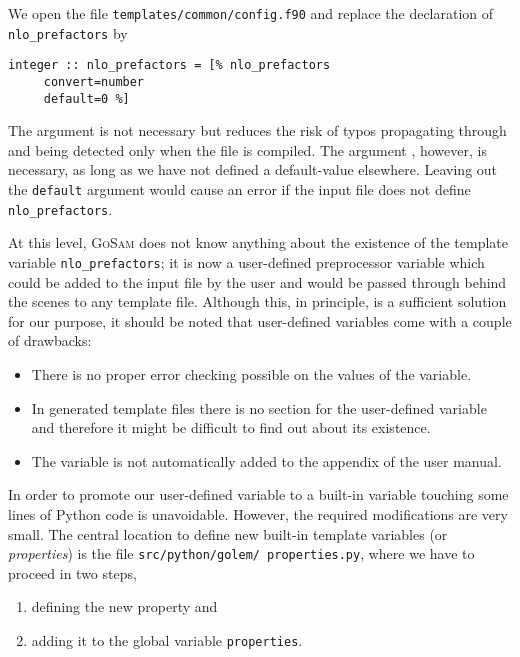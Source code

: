 \documentclass[11pt,a4paper]{refrep}
\newcommand{\golem}{\textsc{GoSam}\xspace}
\newcommand{\python}{Python\xspace}
\begin{document}
We open the file \texttt{templates/\hspace{0pt}common\hspace{0pt}/config.f90}
and replace the declaration of \texttt{nlo\_prefactors} by
\begin{lstlisting}
integer :: nlo_prefactors = [% nlo_prefactors
     convert=number
     default=0 %]
\end{lstlisting}
The argument  is not necessary but reduces the risk
of typos propagating through and being detected only when the file is
compiled. The argument , however, is necessary, as long
as we have not defined a default-value elsewhere. Leaving out the
\texttt{default} argument would cause an error if the input file does
not define \texttt{nlo\_prefactors}.

At this level, \golem{} does not know anything about the existence of
the template variable \texttt{nlo\_prefactors}; it is now a
user-defined preprocessor variable which could be added to the input
file by the user and would be passed through behind the scenes to any
template file.
Although this, in principle, is a sufficient solution for our purpose,
it should be noted that user-defined variables come with a couple of
drawbacks:
\begin{itemize}
\item There is no proper error checking possible on the values of
      the variable.
\item In generated template files there is no section for the
      user-defined variable and therefore it might be difficult
      to find out about its existence.
\item The variable is not automatically added to the appendix of
      the user manual.
\end{itemize}

In order to promote our user-defined variable to a built-in variable
touching some lines of \python{} code is unavoidable. However, the
required modifications are very small. The central location to define
new built-in template variables (or \emph{properties}) is the file
\texttt{src/\hspace{0pt}python/\hspace{0pt}golem/\hspace{0pt}%
properties.py}, where we have to proceed in two steps,
\begin{enumerate}
\item defining the new property and
\item adding it to the global variable \texttt{properties}.
\end{enumerate}
\end{document}
